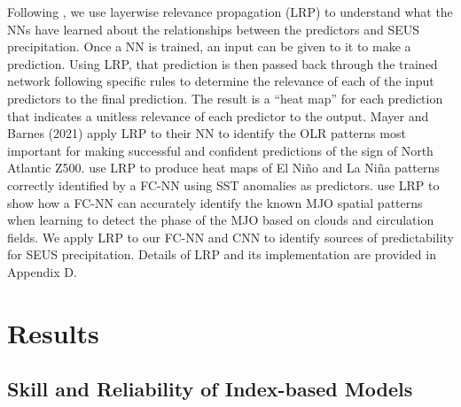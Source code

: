\documentclass{ametsocV6.1}
\begin{document}
Following \citet{barnes_indicator_2020, toms_assessing_2021,toms_physically_2020,toms_testing_2021,mayer_subseasonal_2021}, we use layerwise relevance propagation (LRP) \citep{montavon_layer-wise_2019,bach_pixel-wise_2015} to understand what the NNs have learned about the relationships between the predictors and SEUS precipitation. Once a NN is trained, an input can be given to it to make a prediction. Using LRP, that prediction is then passed back through the trained network following specific rules to determine the relevance of each of the input predictors to the final prediction. The result is a “heat map” for each prediction that indicates a unitless relevance of each predictor to the output. Mayer and Barnes (2021) apply LRP to their NN to identify the OLR patterns most important for making successful and confident predictions of the sign of North Atlantic Z500. \citet{toms_physically_2020} use LRP to produce heat maps of El Ni\~no and La Ni\~na patterns correctly identified by a FC-NN using SST anomalies as predictors.  \citet{toms_testing_2021} use LRP to show how a FC-NN can accurately identify the known MJO spatial patterns when learning to detect the phase of the MJO based on clouds and circulation fields. We apply LRP to our FC-NN and CNN to identify sources of predictability for SEUS precipitation. Details of LRP and its implementation are provided in Appendix D.

\section{Results}
\label{sec:results}

\subsection{Skill and Reliability of Index-based Models}
\label{sec:resultsindex}
\end{document}
